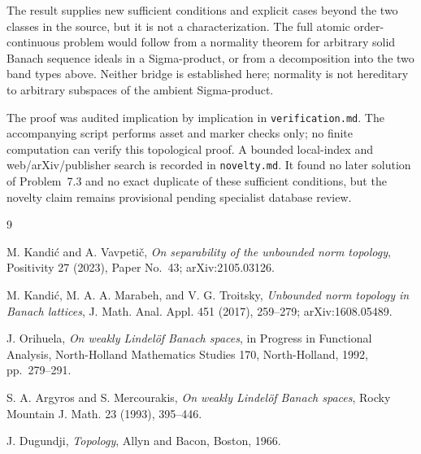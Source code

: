 \documentclass[11pt]{amsart}
\begin{document}
The result supplies new sufficient conditions and explicit cases beyond the
two classes in the source, but it is not a characterization.  The full atomic
order-continuous problem would follow from a normality theorem for arbitrary
solid Banach sequence ideals in a Sigma-product, or from a decomposition into
the two band types above.  Neither bridge is established here; normality is
not hereditary to arbitrary subspaces of the ambient Sigma-product.

The proof was audited implication by implication in
\texttt{verification.md}.  The accompanying script performs asset and marker
checks only; no finite computation can verify this topological proof.  A
bounded local-index and web/arXiv/publisher search is recorded in
\texttt{novelty.md}.  It found no later solution of Problem~7.3 and no exact
duplicate of these sufficient conditions, but the novelty claim remains
provisional pending specialist database review.

\begin{thebibliography}{9}

M. Kandi\'c and A. Vavpeti\v{c},
\emph{On separability of the unbounded norm topology},
Positivity 27 (2023), Paper No.~43;
arXiv:2105.03126.

M. Kandi\'c, M. A. A. Marabeh, and V. G. Troitsky,
\emph{Unbounded norm topology in Banach lattices},
J. Math. Anal. Appl. 451 (2017), 259--279;
arXiv:1608.05489.

J. Orihuela,
\emph{On weakly Lindel\"of Banach spaces},
in Progress in Functional Analysis, North-Holland Mathematics Studies 170,
North-Holland, 1992, pp.~279--291.

S. A. Argyros and S. Mercourakis,
\emph{On weakly Lindel\"of Banach spaces},
Rocky Mountain J. Math. 23 (1993), 395--446.

J. Dugundji,
\emph{Topology},
Allyn and Bacon, Boston, 1966.

\end{thebibliography}
\end{document}
